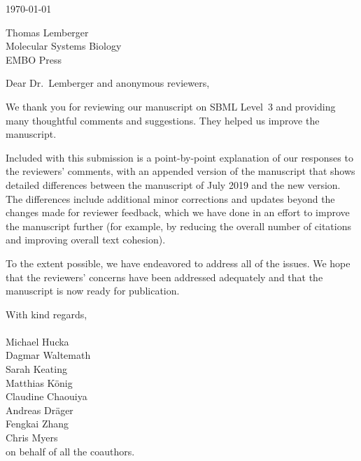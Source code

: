 \documentclass[11pt]{mhletter}
\begin{document}
\thispagestyle{empty}


\vspace*{4em}

\hspace{4.1in}\today

\vspace*{1em}

\begin{flushleft}
Thomas Lemberger\\
Molecular Systems Biology\\
EMBO Press
\end{flushleft}

\vspace*{1em}

\setlength{\parskip}{0.7em}

Dear Dr.\ Lemberger and anonymous reviewers,

We thank you for reviewing our manuscript on SBML Level~3 and providing many thoughtful comments and suggestions.  They helped us improve the manuscript.  

Included with this submission is a point-by-point explanation of our responses to the reviewers' comments, with an appended version of the manuscript that shows detailed differences between the manuscript of July 2019 and the new version.  The differences include additional minor corrections and updates beyond the changes made for reviewer feedback, which we have done in an effort to improve the manuscript further (for example, by reducing the overall number of citations and improving overall text cohesion).

To the extent possible, we have endeavored to address all of the issues.  We hope that the reviewers' concerns have been addressed adequately and that the manuscript is now ready for publication.


\vspace*{1em}
\hspace{4in}
\begin{minipage}{3in}
With kind regards,\\
\\[1ex]
Michael Hucka\\
Dagmar Waltemath\\
Sarah Keating\\
Matthias K\"{o}nig\\
Claudine Chaouiya\\
Andreas Dr\"{a}ger\\
Fengkai Zhang\\
Chris Myers\\
on behalf of all the coauthors.
\end{minipage}
\end{document}
